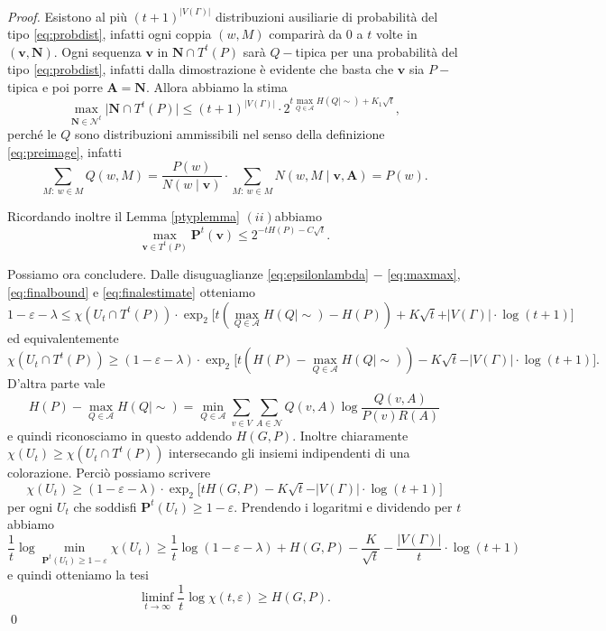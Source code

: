 \begin{proof}
	Esistono al più \((t+1)^{\vert V(\Gamma)\vert}\) distribuzioni ausiliarie di probabilità del tipo \eqref{eq:probdist}, infatti ogni coppia \((w,M)\) comparirà da \(0\) a \(t\) volte in \((\mathbf{v},\mathbf{N})\). Ogni sequenza \(\mathbf{v}\) in \(\mathbf{N}\cap T^{t}(P)\) sarà \(Q-\)tipica per una probabilità del tipo \eqref{eq:probdist}, infatti dalla dimostrazione è evidente che basta che \(\mathbf{v}\) sia \(P-\)tipica e poi porre \(\mathbf{A}=\mathbf{N}\). Allora abbiamo la stima 
	\begin{equation}
		\label{eq:finalbound} \max_{\mathbf{N}\in \mathcal{N}^t} \big\vert \mathbf{N}\cap T^{t}(P) \big\vert \le (t+1)^{\vert V(\Gamma)\vert} \cdot 2^{t\max_{Q\in \mathcal{A}} H(Q\mid\sim)+K_1\sqrt{t}}, 
	\end{equation}
	perché le \(Q\) sono distribuzioni ammissibili nel senso della definizione \eqref{eq:preimage}, infatti
	\[\sum_{M:\ w\in M} Q(w, M)=\frac{P(w)}{N(w\mid \mathbf{v})}\cdot \sum_{M:\ w\in M} N(w,M\mid \mathbf{v}, \mathbf{A})=P(w).\]
	
	Ricordando inoltre il Lemma \ref{ptyplemma} \((ii)\)abbiamo 
	\begin{equation}
		\label{eq:finalestimate} \max_{\mathbf{v}\in T^{t}(P)} \mathbf{P}^t(\mathbf{v}) \le 2^{-tH(P)-C\sqrt{t}}. 
	\end{equation}
	
	Possiamo ora concludere. Dalle disuguaglianze \eqref{eq:epsilonlambda} \(-\) \eqref{eq:maxmax}, \eqref{eq:finalbound} e \eqref{eq:finalestimate} otteniamo
	\[1-\varepsilon-\lambda \le \chi(U_{t}\cap T^t(P))\cdot \exp_{2}{\big[t(\max_{Q\in \mathcal{A}} H(Q\mid\sim)-H(P)) + K\sqrt{t}} + \vert V(\Gamma)\vert\cdot\log{(t+1)} \big]\]
	ed equivalentemente
	\[\chi(U_{t}\cap T^t(P))\ge (1-\varepsilon-\lambda)\cdot \exp_{2}{\big[t(H(P)-\max_{Q\in \mathcal{A}} H(Q\mid\sim)) - K\sqrt{t}} - \vert V(\Gamma)\vert\cdot\log{(t+1)} \big].\]
	D'altra parte vale
	\[H(P)-\max_{Q\in \mathcal{A}} H(Q\mid\sim) = \min_{Q\in \mathcal{A}} \sum_{v\in V}\sum_{A\in \mathcal{N}} Q(v,A)\log{\frac{Q(v,A)}{P(v)R(A)}}\]
	e quindi riconosciamo in questo addendo \(H(G,P)\). Inoltre chiaramente \(\chi(U_{t})\ge\chi(U_{t}\cap T^{t}(P))\) intersecando gli insiemi indipendenti di una colorazione. Perciò possiamo scrivere
	\[\chi(U_{t})\ge (1-\varepsilon-\lambda)\cdot \exp_{2}{\big[tH(G,P) - K\sqrt{t}} - \vert V(\Gamma)\vert\cdot\log{(t+1)} \big]\]
	per ogni \(U_{t}\) che soddisfi \(\mathbf{P}^t(U_{t})\ge 1-\varepsilon\). Prendendo i logaritmi e dividendo per \(t\) abbiamo
	\[\frac{1}{t}\log{\min_{\mathbf{P}^t(U_{t})\ge 1-\varepsilon}} \chi(U_{t})\ge \frac{1}{t}\log{(1-\varepsilon-\lambda)} + H(G,P) - \frac{K}{\sqrt{t}} - \frac{\vert V(\Gamma)\vert}{t}\cdot \log{(t+1)}\]
	e quindi otteniamo la tesi
	\[ \liminf_{t\to \infty} \frac{1}{t}\log\chi(t,\varepsilon)\ge H(G,P). \]
	\qed 
\end{proof}
